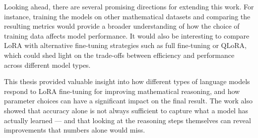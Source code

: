   Looking ahead, there are several promising
  directions for extending this work. For instance,
  training the models on other
  mathematical datasets and comparing the
  resulting metrics would provide a broader
  understanding of how the choice of training
  data affects model performance. It would also be interesting
  to compare LoRA with alternative fine-tuning
  strategies such as full fine-tuning or QLoRA,
  which could shed light on the trade-offs
  between efficiency and performance across
  different model types.

This thesis provided valuable insight into
  how different types of language models respond
  to LoRA fine-tuning for improving mathematical
  reasoning, and how parameter choices can have
  a significant impact on the final result.
  The work also showed that accuracy alone
  is not always sufficient to capture what
  a model has actually learned --- and that
  looking at the reasoning steps themselves
  can reveal improvements that numbers alone would miss.